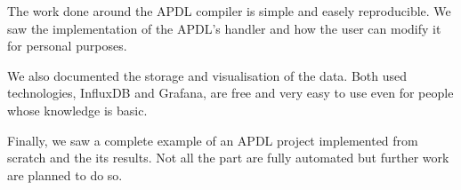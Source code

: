 The work done around the APDL compiler is simple and easely reproducible. We saw
the implementation of the APDL's handler and how the user can modify it for
personal purposes.

We also documented the storage and visualisation of the data. Both used
technologies, InfluxDB and Grafana, are free and very easy to use even for
people whose knowledge is basic.

Finally, we saw a complete example of an APDL project implemented from scratch
and the its results. Not all the part are fully automated but further work are
planned to do so.

